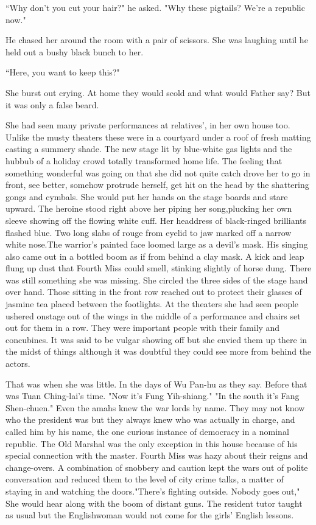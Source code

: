 \par ``Why don't you cut your hair?" he asked. "Why these pigtails? We're a republic now."
\par He chased her around the room with a pair of scissors. She was laughing until he held out a bushy black bunch to her.
\par ``Here, you want to keep this?"
\par She burst out crying. At home they would scold and what would Father say? But it was only a false beard.
\par She had seen many private performances at relatives', in her own house too. Unlike the musty theaters these were in a courtyard under a roof of fresh matting casting a summery shade. The new stage lit by blue-white gas lights and the hubbub of a holiday crowd totally transformed home life. The feeling that something wonderful was going on that she did not quite catch drove her to go in front, see better, somehow protrude herself, get hit on the head by the shattering gongs and cymbals. She would put her hands on the stage boards and stare upward. The heroine stood right above her piping her song,plucking her own sleeve showing off the flowing white cuff. Her headdress of black-ringed brilliants flashed blue. Two long slabs of rouge from eyelid to jaw marked off a narrow white nose.The warrior's painted face loomed large as a devil's mask. His singing also came out in a bottled boom as if from behind a clay mask. A kick and leap flung up dust that Fourth Miss could smell, stinking slightly of horse dung. There was still something she was missing. She circled the three sides of the stage hand over hand. Those sitting in the front row reached out to protect their glasses of jasmine tea placed between the footlights. At the theaters she had seen people ushered onstage out of the wings in the middle of a performance and chairs set out for them in a row. They were important people with their family and concubines. It was said to be vulgar showing off but she envied them up there in the midst of things although it was doubtful they could see more from behind the actors.
\par That was when she was little. In the days of Wu Pan-hu as they say. Before that was Tuan Ching-lai's time. "Now it's Fung Yih-shiang." "In the south it's Fang Shen-chuen." Even the amahs knew the war lords by name. They may not know who the president was but they always knew who was actually in charge, and called him by his name, the one curious instance of democracy in a nominal republic. The Old Marshal was the only exception in this house because of his special connection with the master. Fourth Miss was hazy about their reigns and change-overs. A combination of snobbery and caution kept the wars out of polite conversation and reduced them to the level of city crime talks, a matter of staying in and watching the doors."There's fighting outside. Nobody goes out," She would hear along with the boom of distant guns. The resident tutor taught as usual but the Englishwoman would not come for the girls' English lessons.
